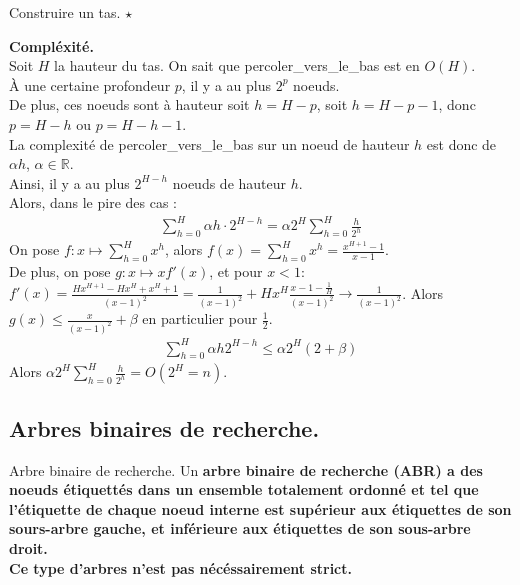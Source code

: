 \documentclass[french, 11pt]{article}
\begin{document}
\begin{defi}{Construire un tas. $\star$}{}
    \begin{algorithm}[H]
        \LinesNumbered
        \caption{Construire un tas}
    \end{algorithm}
    \textbf{Compléxité.}\\
    Soit $H$ la hauteur du tas. On sait que percoler\_vers\_le\_bas est en $O(H)$.\\
    À une certaine profondeur $p$, il y a au plus $2^p$ noeuds.\\
    De plus, ces noeuds sont à hauteur soit $h=H-p$, soit $h=H-p-1$, donc $p=H-h$ ou $p=H-h-1$.\\
    La complexité de percoler\_vers\_le\_bas sur un noeud de hauteur $h$ est donc de $\alpha h$, $\alpha\in\mathbb{R}$.\\
    Ainsi, il y a au plus $2^{H-h}$ noeuds de hauteur $h$.\\
    Alors, dans le pire des cas :
    \begin{align*}
        \sum_{h=0}^{H}{\alpha h\cdot2^{H-h}}=\alpha2^H\sum_{h=0}^{H}{\frac{h}{2^h}}
    \end{align*}
    On pose $f:x\mapsto\sum\limits_{h=0}^Hx^h$, alors $f(x)=\sum\limits_{h=0}^Hx^h=\frac{x^{H+1}-1}{x-1}$.\\
    De plus, on pose $g:x\mapsto xf'(x)$, et pour $x<1$: $f'(x)=\frac{Hx^{H+1}-Hx^{H}+x^{H}+1}{(x-1)^2}=\frac{1}{(x-1)^2}+Hx^H\frac{x - 1 - \frac{1}{H}}{(x-1)^2}\to\frac{1}{(x-1)^2}$.
    Alors $g(x)\leq\frac{x}{(x-1)^2}+\beta$ en particulier pour $\frac{1}{2}$.
    \begin{align*}
        \sum_{h=0}^H\alpha h 2^{H-h}\leq\alpha2^{H}(2+\beta)
    \end{align*}
    Alors $\alpha2^H\sum_{h=0}^H\frac{h}{2^h} = O(2^H = n)$.
\end{defi}

\subsection{Arbres binaires de recherche.}

\begin{defi}{Arbre binaire de recherche.}{}
    Un \bf{arbre binaire de recherche (ABR)} a des noeuds étiquettés dans un ensemble totalement ordonné et tel que l'étiquette de chaque noeud interne est supérieur aux étiquettes de son sours-arbre gauche, et inférieure aux étiquettes de son sous-arbre droit.\\
    Ce type d'arbres n'est pas nécéssairement strict.
\end{defi}
\end{document}
